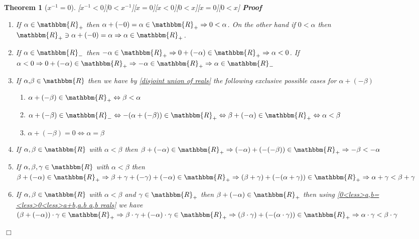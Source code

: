 \documentclass{book}
\newcommand{\comma}{{,}}
\newcommand{\um}{-}
\newcommand{\upl}{+}
\newenvironment{proof}{\noindent\textbf{Proof\ }}{\hspace*{\fill}$\Box$\medskip}
\newtheorem{theorem}{Theorem}
\begin{document}
{{\begin{theorem}[$x^{- 1} = 0$][$x^{- 1} < 0$][$0 < x^{- 1}$][$x = 0$][$x <
0$][$0 < x$][$x = 0$][$0 < x$]
\begin{proof}
    \begin{enumerate}
      \item If $\alpha \in \mathbbm{R}_+$ then $\alpha \upl (\um 0) = \alpha
      \in \mathbbm{R}_+ \Rightarrow 0 < \alpha$. On the other hand if $0 <
      \alpha$ then $\mathbbm{R}_+ \ni \alpha \upl (- 0) = \alpha \Rightarrow
      \alpha \in \mathbbm{R}_+$.
      
      \item If $\alpha \in \mathbbm{R}_-$ then $\um \alpha \in \mathbbm{R}_+
      \Rightarrow 0 \upl (- \alpha) \in \mathbbm{R}_+ \Rightarrow \alpha < 0$.
      If $\alpha < 0 \Rightarrow 0 \upl (- \alpha) \in \mathbbm{R}_+
      \Rightarrow - \alpha \in \mathbbm{R}_+ \Rightarrow \alpha \in
      \mathbbm{R}_-$
      
      \item If $\alpha \comma \beta \in \mathbbm{R}$ then we have by
      \ref{disjoint union of reals} the following exclusive possible cases for
      $\alpha \upl (- \beta)$
      \begin{enumerate}
        \item $\alpha \upl (- \beta) \in \mathbbm{R}_+ \Leftrightarrow \beta <
        \alpha$
        
        \item $\alpha \upl (- \beta) \in \mathbbm{R}_- \Leftrightarrow -
        (\alpha \upl (- \beta)) \in \mathbbm{R}_+ \Leftrightarrow \beta \upl
        (- \alpha) \in \mathbbm{R}_+ \Leftrightarrow \alpha < \beta$
        
        \item $\alpha \upl (- \beta) = 0 \Leftrightarrow \alpha = \beta$
      \end{enumerate}
      \item If $\alpha, \beta \in \mathbbm{R}$ with $\alpha < \beta$ then
      $\beta \upl (- \alpha) \in \mathbbm{R}_+ \Rightarrow (- \alpha) \upl (-
      (- \beta)) \in \mathbbm{R}_+ \Rightarrow - \beta < - \alpha$
      
      \item If $\alpha, \beta, \gamma \in \mathbbm{R}$ with $\alpha < \beta$
      then $\beta \upl (- \alpha) \in \mathbbm{R}_+ \Rightarrow \beta \upl
      \gamma + (- \gamma) \upl (- \alpha) \in \mathbbm{R}_+ \Rightarrow (\beta
      \upl \gamma) \upl (\um (\alpha \upl \gamma)) \in \mathbbm{R}_+
      \Rightarrow \alpha \upl \gamma < \beta \upl \gamma$
      
      \item If $\alpha, \beta \in \mathbbm{R}$ with $\alpha < \beta$ and
      $\gamma \in \mathbbm{R}_+$ then $\beta \upl (- \alpha) \in
      \mathbbm{R}_+$ then using \ref{0<less>a,b=<less>0<less>a+b,a.b a,b
      reals} we have $(\beta \upl (- \alpha)) \cdot \gamma \in \mathbbm{R}_+
      \Rightarrow \beta \cdot \gamma \upl (- \alpha) \cdot \gamma \in
      \mathbbm{R}_+ \Rightarrow (\beta \cdot \gamma) \upl (\um (\alpha \cdot
      \gamma)) \in \mathbbm{R}_+ \Rightarrow \alpha \cdot \gamma < \beta \cdot
      \gamma$
      

\end{enumerate}
\end{proof}
\end{theorem}}}
\end{document}
